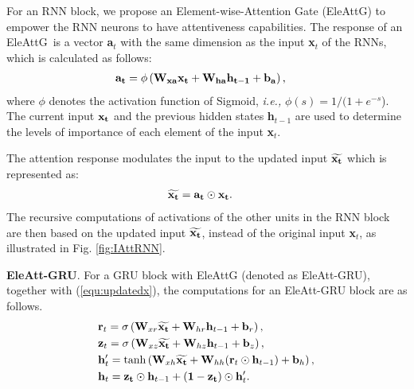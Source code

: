 \documentclass[journal]{IEEEtran}
\newcommand{\Outer}{Element-wise}
\newcommand{\EleAttGn}{{EleAttG}}
\newcommand{\EleAttG}{{EleAttG~}}
\begin{document}
For an RNN block, we propose an \Outer-Attention Gate (\EleAttGn) to empower the RNN neurons to have attentiveness capabilities. The response of an \EleAttG is a vector \textbf{{a}$_t$} with the same dimension as the input \textbf{{x}$_t$} of the RNNs, which is calculated as follows:
\begin{eqnarray}
\label{equ:agru}
\begin{aligned}
\!&\bf{a}_t =\phi \left({\bf{W}_{xa}}{\bf{x}_t} + {\bf{W}_{ha} {\bf{h}_{t-1}}} + {\bf{b}_a}  \right),
\end{aligned}
\end{eqnarray}
where $\phi$ denotes the activation function of Sigmoid, {\it i.e.,} $\phi(s) = 1/(1+e^{-s}$). The current input $\bf{x}_t$ and the previous hidden states \textbf{{h}$_{t-1}$} are used to determine the levels of importance of each element of the input \textbf{{x}$_t$}.

The attention response modulates the input to the updated input $\widetilde{\bf{x}_t}$ which is represented as: 
\begin{eqnarray}
\label{equ:updatedx}
\begin{aligned}
\!&\widetilde{\bf{x}_t}= \bf{a}_t \odot {\bf{x}_t}.
\end{aligned}
\end{eqnarray}
The recursive computations of activations of the other units in the RNN block are then based on the updated input $\widetilde{\bf{x}_t}$, instead of the original input \textbf{{x}$_t$}, as illustrated in Fig. \ref{fig:IAttRNN}.

\textbf{EleAtt-GRU}. For a GRU block with EleAttG (denoted as EleAtt-GRU), together with (\ref{equ:updatedx}), the computations for an EleAtt-GRU block are as follows.
\begin{equation}
\label{equ:EleAtt-gru}
\begin{aligned}
\!&\mathbf{r}_t = \sigma \left( {\mathbf{W}}_{xr} \widetilde{\bf{x}_t} + {\mathbf{W}}_{hr} \mathbf{h}_{t-1} + \mathbf{b}_r \right),\\
\!&\mathbf{z}_t = \sigma \left( {\mathbf{W}}_{xz} \widetilde{\bf{x}_t} + {\mathbf{W}}_{hz} \mathbf{h}_{t-1} + \mathbf{b}_z \right),\\
\!&\mathbf{h}_t' = \tanh \left( {\mathbf{W}}_{xh} \widetilde{\bf{x}_t} + {\mathbf{W}}_{hh} (\mathbf{r}_t \odot \mathbf{h}_{t-1}) + \mathbf{b}_h \right),\\
\!&\mathbf{h}_t =  {\mathbf{z_t}} \odot {\mathbf{h}_{t-1}}  + ({\mathbf{1 - z_t}}) \odot {\mathbf{h}_t'}.\\
\end{aligned}
\end{equation}
\end{document}
